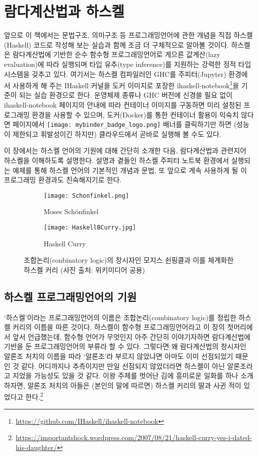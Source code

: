 \chapter{람다계산법과 하스켈}
앞으로 이 책에서는 문법구조, 의미구조 등 프로그래밍언어에 관한
개념을 직접 하스켈(Haskell) 코드로 작성해 보는 실습과 함께
조금 더 구체적으로 알아볼 것이다. 하스켈은 람다계산법에 기반한
순수 함수형 프로그래밍언어로 게으른 값계산(lazy evaluation)에
따라 실행되며 타입 유추(type inference)를 지원하는 강력한
정적 타입 시스템을 갖추고 있다. 여기서는 하스켈 컴파일러인
GHC를 주피터(Jupyter) 환경에서 사용하게 해 주는 IHaskell 커널을
도커 이미지로 포장한 ihaskell-notebook\footnote{%
\url{https://github.com/IHaskell/ihaskell-notebook}}을 기준이 되는
실습 환경으로 한다. 운영체제 종류나 GHC 버전에 신경쓸 필요 없이
ihaskell-notebook 페이지의 안내에 따라 컨테이너 이미지를 구동하면
미리 설정된 프로그래밍 환경을 사용할 수 있으며,
도커(Docker)를 통한 컨테이너 활용이 익숙치 않다면 페이지에서
\texttt{[image: mybinder\_badge\_logo.png]} 배너를 클릭하기만 하면
(성능이 제한되고 휘발성이긴 하지만) 클라우드에서 곧바로 실행해 볼 수도 있다.

이 장에서는 하스켈 언어의 기원에 대해 간단히 소개한 다음,
람다계산법과 관련지어 하스켈을 이해하도록 설명한다.
설명과 곁들인 하스켈 주피터 노트북 환경에서 실행되는 예제를 통해
하스켈 언어의 기본적인 개념과 문법, 또 앞으로 계속 사용하게 될
이 프로그래밍 환경과도 친숙해지기로 한다.
\newpage

\begin{figure}\centering
\begin{subfigure}[b]{.3\textwidth}\centering
\texttt{[image: Schonfinkel.png]}
\caption{Moses Sch\"onfinkel}
\end{subfigure}
\begin{subfigure}[b]{.3\textwidth}\centering
\texttt{[image: HaskellBCurry.jpg]}
\caption{Haskell Curry}
\end{subfigure}
\caption{조합논리(conbinatory logic)의 창시자인
         모지스 쇤핑클과 이를 체계화한 하스켈 커리
         {\footnotesize(사진 출처: 위키미디어 공용)} }
\end{figure}

\section{하스켈 프로그래밍언어의 기원}
`하스켈'이라는 프로그래밍언어의 이름은 조합논리(combinatory logic)를
정립한 하스켈 커리의 이름을 따른 것이다. 하스켈이 함수형 프로그래밍언어라고
이 장의 첫머리에서 앞서 언급했는데, 함수형 언어가 무엇인지 아주 간단히
이야기자하면 람다계산법에 기반을 둔 프로그래밍언어의 부류라 할 수 있다.
그렇다면 왜 람다계산법의 창시자인 알론조 처치의 이름을 따라 `알론조'라 부르지
않았냐면 아마도 이미 선점\cite{Ramsdell1989alonzo}되었기 때문인 것 같다.
어디까지나 추측이지만 만일 선점되지 않았더라면 하스켈이 아닌 알론조라고
지었을 가능성도 있을 것 같다. 이왕 주제를 벗어난 김에 흥미로운 일화를 하나
소개하자면, 알론조 처치의 아들은 (본인의 말에 따르면) 하스켈 커리의 딸과
사귄 적이 있었다고 한다.\footnote{%
\url{https://importantshock.wordpress.com/2007/08/21/haskell-curry-yes-i-dated-his-daughter/}}

